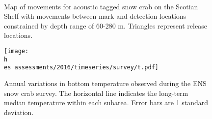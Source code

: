 \documentclass[11pt]{article}
\newcommand{\h}{\string~}
\newcommand{\es}{bio.data/bio.snowcrab/}
\begin{document}
\begin{figure}
\centering
{}\
\caption{Map of movements for acoustic tagged snow crab on the Scotian Shelf with movements between mark and detection locations constrained by depth range of 60-280 m. Triangles represent release locations.}
\end{figure}
\clearpage

\begin{figure}
\centering
\texttt{[image: \\h \\es assessments/2016/timeseries/survey/t.pdf]} %
\caption{Annual variations in bottom temperature observed during the ENS snow crab survey. The horizontal line indicates the long-term median temperature within each subarea. Error bars are 1 standard deviation. }
\end{figure}
\clearpage
\end{document}
